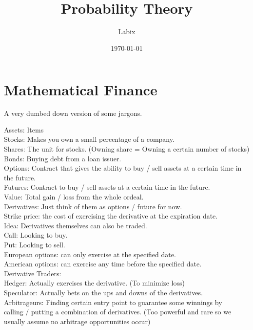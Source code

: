 \documentclass[a4paper]{article}
\title{Probability Theory}
\author{Labix}
\date{\today}
\begin{document}
\maketitle
\begin{abstract}
\end{abstract}
\tableofcontents

\pagebreak
\section{Mathematical Finance}
A very dumbed down version of some jargons. 

Assets: Items\\
Stocks: Makes you own a small percentage of a company. \\
Shares: The unit for stocks. (Owning share = Owning a certain number of stocks)\\
Bonds: Buying debt from a loan issuer. \\
Options: Contract that gives the ability to buy / sell assets at a certain time in the future. \\
Futures: Contract to buy / sell assets at a certain time in the future. \\
Value: Total gain / loss from the whole ordeal. \\

Derivatives: Just think of them as options / future for now. \\
Strike price: the cost of exercising the derivative at the expiration date. \\

Idea: Derivatives themselves can also be traded. \\

Call: Looking to buy. \\
Put: Looking to sell. \\

European options: can only exercise at the specified date. \\
American options: can exercise any time before the specified date. \\

Derivative Traders: \\
Hedger: Actually exercises the derivative. (To minimize loss)\\
Speculator: Actually bets on the ups and downs of the derivatives. \\
Arbitrageurs: Finding certain entry point to guarantee some winnings by\\ calling / putting a combination of derivatives. (Too powerful and rare so we usually assume no arbitrage opportunities occur)\\
\end{document}
